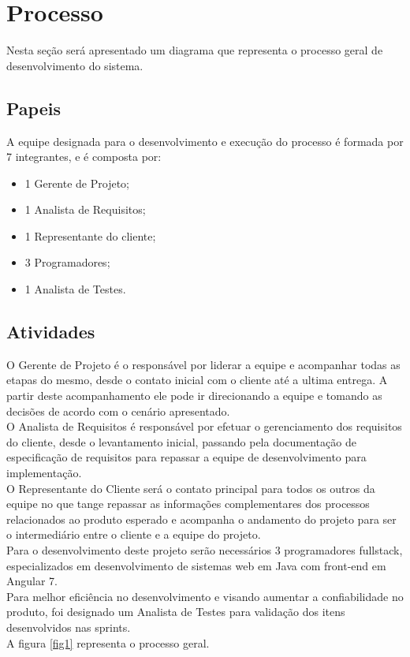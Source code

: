 \documentclass[	DIV=calc,%
							paper=a4,%
							fontsize=12pt,%
							onecolumn]{scrartcl}	 					%
\begin{document}
\section{Processo}
Nesta seção será apresentado um diagrama que representa o processo geral de desenvolvimento do sistema.

\subsection{Papeis}
A equipe designada para o desenvolvimento e execução do processo é formada por 7 integrantes, e é composta por:
\begin{itemize}
\item 1 Gerente de Projeto;
\item 1 Analista de Requisitos;
\item 1 Representante do cliente;
\item 3 Programadores;
\item 1 Analista de Testes.
\end{itemize}

\subsection{Atividades}
O Gerente de Projeto é o responsável por liderar a equipe e acompanhar todas as etapas do mesmo, desde o contato inicial com o cliente até a ultima entrega. A partir deste acompanhamento ele pode ir direcionando a equipe e tomando as decisões de acordo com o cenário apresentado.
\\O Analista de Requisitos é responsável por efetuar o gerenciamento dos requisitos do cliente, desde o levantamento inicial, passando pela documentação de especificação de requisitos para repassar a equipe de desenvolvimento para implementação.
\\O Representante do Cliente será o contato principal para todos os outros da equipe no que tange repassar as informações complementares dos processos relacionados ao produto esperado e acompanha o andamento do projeto para ser o intermediário entre o cliente e a equipe do projeto.
\\Para o desenvolvimento deste projeto serão necessários 3 programadores fullstack, especializados em desenvolvimento de sistemas web em Java com front-end em Angular 7.
\\Para melhor eficiência no desenvolvimento e visando aumentar a confiabilidade no produto, foi designado um Analista de Testes para validação dos itens desenvolvidos nas sprints.
\\A figura \ref{fig1} representa o processo geral.
\end{document}
